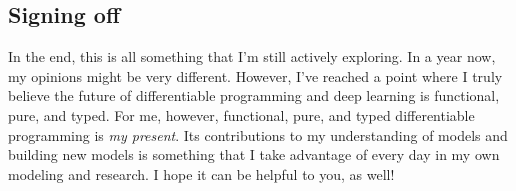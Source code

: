 \documentclass[]{article}
\begin{document}
\hypertarget{signing-off}{%
\subsection{Signing off}\label{signing-off}}

In the end, this is all something that I'm still actively exploring. In a year
now, my opinions might be very different. However, I've reached a point where I
truly believe the future of differentiable programming and deep learning is
functional, pure, and typed. For me, however, functional, pure, and typed
differentiable programming is \emph{my present}. Its contributions to my
understanding of models and building new models is something that I take
advantage of every day in my own modeling and research. I hope it can be helpful
to you, as well!
\end{document}
